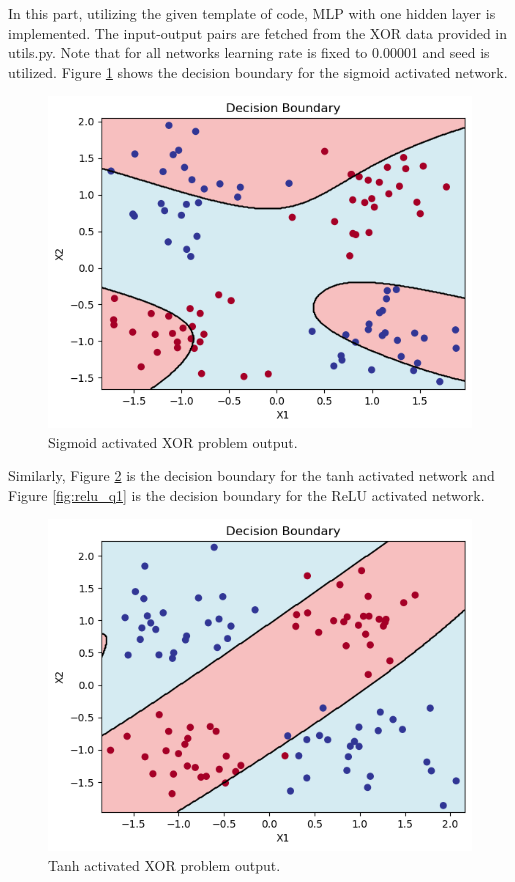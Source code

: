 \documentclass{assignment}
\begin{document}
In this part, utilizing the given template of code, MLP with one hidden layer is implemented. The input-output pairs are fetched from the XOR data provided in utils.py. Note that for all networks learning rate is fixed to 0.00001 and seed is utilized. Figure \ref{fig:sigmoid_q1} shows the decision boundary for the sigmoid activated network. 
\begin{figure}[htbp!]
    \centering
    \includegraphics[width=1\textwidth]{figures/q1_sigmoid.png}
    \caption{Sigmoid activated XOR problem output.}
    \label{fig:sigmoid_q1}
\end{figure}
Similarly, Figure \ref{fig:tanh_q1} is the decision boundary for the tanh activated network and Figure \ref{fig:relu_q1} is the decision boundary for the ReLU activated network.


\begin{figure}[htbp!]
    \centering
    \includegraphics[width=1\textwidth]{figures/q1_tanh.png}
    \caption{Tanh activated XOR problem output.}
    \label{fig:tanh_q1}
\end{figure}
\end{document}

